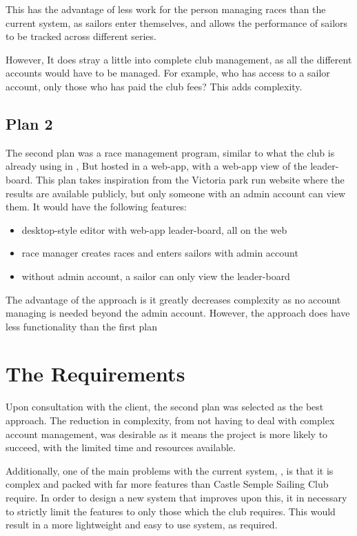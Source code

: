 \documentclass{l4proj}
\begin{document}
This has the advantage of less work for the person managing races than the current system, as sailors enter themselves, and allows the performance of sailors to be tracked across different series.

However, It does stray a little into complete club management, as all the different accounts would have to be managed. For example, who has access to a sailor account, only those who has paid the club fees? This adds complexity.

\subsection{Plan 2}
The second plan was a race management program, similar to what the club is already using in \citet{sailwave}, But hosted in a web-app, with a web-app view of the leader-board. This plan takes inspiration from the Victoria park run website \citeyear{Parkrun} where the results are available publicly, but only someone with an admin account can view them. It would have the following features:
\begin{itemize}
    \item
    desktop-style editor with web-app leader-board, all on the web
    \item
    race manager creates races and enters sailors with admin account
    \item
    without admin account, a sailor can only view the leader-board
\end{itemize}

The advantage of the approach is it greatly decreases complexity as no account managing is needed beyond the admin account. However, the approach does have less functionality than the first plan

\section{The Requirements}
Upon consultation with the client, the second plan was selected as the best approach. The reduction in complexity, from not having to deal with complex account management, was desirable as it means the project is more likely to succeed, with the limited time and
resources available.

Additionally, one of the main problems with the current system, \citep{sailwave}, is that it is complex and packed with far more features than Castle Semple Sailing Club require. In order to design a new system that improves upon this, it in necessary to strictly limit the features to only those which the club requires. This would result in a more lightweight and easy to use system, as required.
\end{document}

